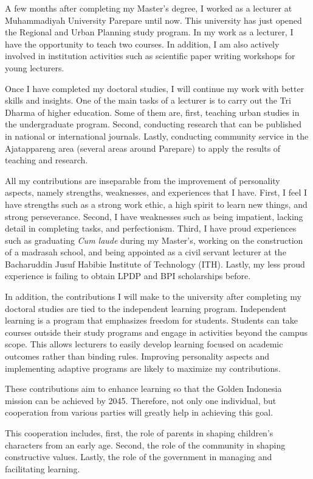 \documentclass[../main.tex]{subfiles}
\begin{document}
A few months after completing my Master's degree, I worked as a lecturer at Muhammadiyah University Parepare until now. This university has just opened the Regional and Urban Planning study program. In my work as a lecturer, I have the opportunity to teach two courses. In addition, I am also actively involved in institution activities such as scientific paper writing workshops for young lecturers.

Once I have completed my doctoral studies, I will continue my work with better skills and insights. One of the main tasks of a lecturer is to carry out the Tri Dharma of higher education. Some of them are, first, teaching urban studies in the undergraduate program. Second, conducting research that can be published in national or international journals. Lastly, conducting community service in the Ajatappareng area (several areas around Parepare) to apply the results of teaching and research.

All my contributions are inseparable from the improvement of personality aspects, namely strengths, weaknesses, and experiences that I have. First, I feel I have strengths such as a strong work ethic, a high spirit to learn new things, and strong perseverance. Second, I have weaknesses such as being impatient, lacking detail in completing tasks, and perfectionism. Third, I have proud experiences such as graduating \textit{Cum laude} during my Master's, working on the construction of a madrasah school, and being appointed as a civil servant lecturer at the Bacharuddin Jusuf Habibie Institute of Technology (ITH). Lastly, my less proud experience is failing to obtain LPDP and BPI scholarships before.

In addition, the contributions I will make to the university after completing my doctoral studies are tied to the independent learning program. Independent learning is a program that emphasizes freedom for students. Students can take courses outside their study programs and engage in activities beyond the campus scope. This allows lecturers to easily develop learning focused on academic outcomes rather than binding rules. Improving personality aspects and implementing adaptive programs are likely to maximize my contributions.

These contributions aim to enhance learning so that the Golden Indonesia mission can be achieved by 2045. Therefore, not only one individual, but cooperation from various parties will greatly help in achieving this goal.

This cooperation includes, first, the role of parents in shaping children's characters from an early age. Second, the role of the community in shaping constructive values. Lastly, the role of the government in managing and facilitating learning.
\end{document}

